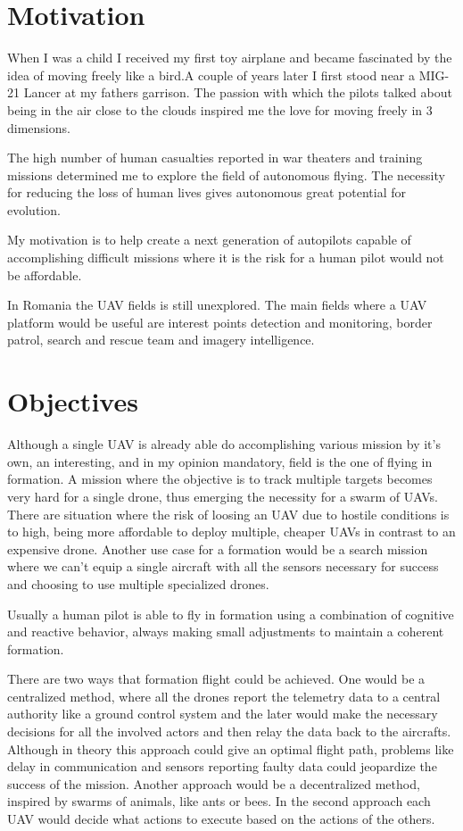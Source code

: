 \section{Motivation}
\label{sec:motivation}
When I was a child I received my first toy airplane and became fascinated
by the idea of moving freely like a bird.A couple of years later I first stood 
near a MIG-21 Lancer at my fathers garrison. The passion with which the pilots 
talked about being in the air close to the clouds inspired me the love for moving 
freely in 3 dimensions.

The high number of human casualties reported in war theaters and training missions
determined me to explore the field of autonomous flying. The necessity for reducing
the loss of human lives gives autonomous great potential for evolution.

My motivation is to help create a next generation of autopilots capable of 
accomplishing difficult missions where it is the risk for a human pilot would 
not be affordable.

In Romania the UAV fields is still unexplored. The main fields where a UAV
platform would be useful are interest points detection and monitoring, border
patrol, search and rescue team and imagery intelligence.

\section{Objectives}
\label{sec:objectives}

Although a single UAV is already able do accomplishing various mission by it's
own, an interesting, and in my opinion mandatory,  field is the one of flying in
formation. A mission where the objective is to track multiple targets becomes
very hard for a single drone, thus emerging the necessity for a swarm of UAVs.
There are situation where the risk of loosing an UAV due to hostile conditions
is to high, being more affordable to deploy multiple,  cheaper UAVs in contrast
to an expensive drone. Another use case for a formation would be a search mission
where we can't equip a single aircraft with all the sensors necessary for success
and choosing to use multiple specialized drones.

Usually a human pilot is able to fly in formation using a combination of
cognitive and reactive behavior,  always making small adjustments to maintain a
coherent formation.

There are two ways that formation flight could be achieved. One would be a 
centralized method,  where all the drones report the telemetry data to a central
authority like a ground control system and the later would make the necessary 
decisions for all the involved actors and then relay the data back to the aircrafts.
Although in theory this approach could give an optimal flight path,  problems
like delay in communication and sensors reporting faulty data could jeopardize
the success of the mission. Another approach would be a decentralized method, 
inspired by swarms of animals, like ants or bees. In the second approach each 
UAV would decide what actions to execute based on the actions of the others.

